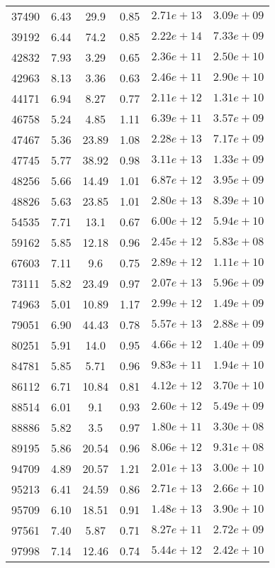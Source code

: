 \begin{table}
\begin{tabular}{cccccc}
37490 & 6.43 & 29.9 & 0.85 & $2.71e+13$ & $3.09e+09$ \\
39192 & 6.44 & 74.2 & 0.85 & $2.22e+14$ & $7.33e+09$ \\
42832 & 7.93 & 3.29 & 0.65 & $2.36e+11$ & $2.50e+10$ \\
42963 & 8.13 & 3.36 & 0.63 & $2.46e+11$ & $2.90e+10$ \\
44171 & 6.94 & 8.27 & 0.77 & $2.11e+12$ & $1.31e+10$ \\
46758 & 5.24 & 4.85 & 1.11 & $6.39e+11$ & $3.57e+09$ \\
47467 & 5.36 & 23.89 & 1.08 & $2.28e+13$ & $7.17e+09$ \\
47745 & 5.77 & 38.92 & 0.98 & $3.11e+13$ & $1.33e+09$ \\
48256 & 5.66 & 14.49 & 1.01 & $6.87e+12$ & $3.95e+09$ \\
48826 & 5.63 & 23.85 & 1.01 & $2.80e+13$ & $8.39e+10$ \\
54535 & 7.71 & 13.1 & 0.67 & $6.00e+12$ & $5.94e+10$ \\
59162 & 5.85 & 12.18 & 0.96 & $2.45e+12$ & $5.83e+08$ \\
67603 & 7.11 & 9.6 & 0.75 & $2.89e+12$ & $1.11e+10$ \\
73111 & 5.82 & 23.49 & 0.97 & $2.07e+13$ & $5.96e+09$ \\
74963 & 5.01 & 10.89 & 1.17 & $2.99e+12$ & $1.49e+09$ \\
79051 & 6.90 & 44.43 & 0.78 & $5.57e+13$ & $2.88e+09$ \\
80251 & 5.91 & 14.0 & 0.95 & $4.66e+12$ & $1.40e+09$ \\
84781 & 5.85 & 5.71 & 0.96 & $9.83e+11$ & $1.94e+10$ \\
86112 & 6.71 & 10.84 & 0.81 & $4.12e+12$ & $3.70e+10$ \\
88514 & 6.01 & 9.1 & 0.93 & $2.60e+12$ & $5.49e+09$ \\
88886 & 5.82 & 3.5 & 0.97 & $1.80e+11$ & $3.30e+08$ \\
89195 & 5.86 & 20.54 & 0.96 & $8.06e+12$ & $9.31e+08$ \\
94709 & 4.89 & 20.57 & 1.21 & $2.01e+13$ & $3.00e+10$ \\
95213 & 6.41 & 24.59 & 0.86 & $2.71e+13$ & $2.66e+10$ \\
95709 & 6.10 & 18.51 & 0.91 & $1.48e+13$ & $3.90e+10$ \\
97561 & 7.40 & 5.87 & 0.71 & $8.27e+11$ & $2.72e+09$ \\
97998 & 7.14 & 12.46 & 0.74 & $5.44e+12$ & $2.42e+10$ \\

\end{tabular}
\end{table}
